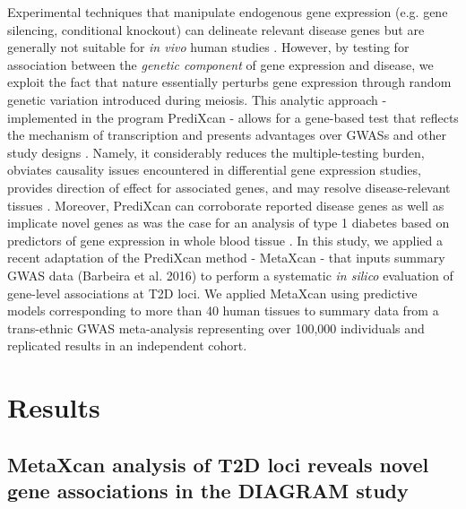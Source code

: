 \documentclass[10pt]{article}
\begin{document}
Experimental techniques that manipulate endogenous gene expression (e.g. gene silencing,  conditional knockout) can delineate relevant disease genes but are generally not suitable for \textit{in vivo} human studies \cite{Doyle2011, Leung2005}. However, by testing for association between the \textit{genetic component} of gene expression and disease, we exploit the fact that nature essentially perturbs gene expression through random genetic variation introduced during meiosis. This analytic approach - implemented in the program PrediXcan - allows for a gene-based test that reflects the mechanism of transcription and presents advantages over GWASs and other study designs \cite{Gamazon2015}. Namely, it considerably reduces the multiple-testing burden, obviates causality issues encountered in differential gene expression studies, provides direction of effect for associated genes, and may resolve disease-relevant tissues \cite{Gamazon2015}. Moreover, PrediXcan can corroborate reported disease genes as well as implicate novel genes as was the case for an analysis of type 1 diabetes based on predictors of gene expression in whole blood tissue \cite{Gamazon2015}. In this study, we applied a recent adaptation of the PrediXcan method - MetaXcan - that inputs summary GWAS data \cite{Barbeira2016} (Barbeira et al. 2016) to perform a systematic \textit{in silico} evaluation of gene-level associations at T2D loci. We applied MetaXcan using predictive models corresponding to more than 40 human tissues to summary data from a trans-ethnic GWAS meta-analysis representing over 100,000 individuals and replicated results in an independent cohort. 

\section*{Results}

\subsection*{MetaXcan analysis of T2D loci reveals novel gene associations in the DIAGRAM study}
\end{document}
